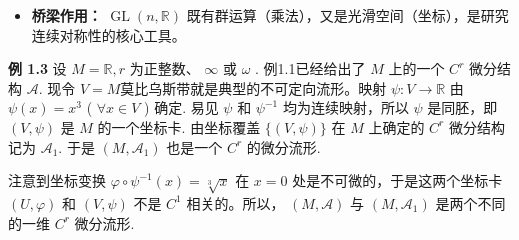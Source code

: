 \begin{myremark}
\begin{itemize}
\item \textbf{桥梁作用：}  $\operatorname{GL}(n, \mathbb{R}) $ 既有群运算（乘法），又是光滑空间（坐标），是研究连续对称性的核心工具。
\end{itemize}

%

\end{myremark}

{\bf 例 1.3} 设  $M = \mathbb{R}, r$  为正整数、 $\infty$  或  $\omega$ . 例1.1已经给出了  $M$  上的一个  $C^r$  微分结构  $\mathcal{A}$. 现令  $V = M$莫比乌斯带就是典型的不可定向流形。映射  $\psi : V \to \mathbb{R}$  由  $\psi(x) = x^3$  ( $\forall x \in V$ ) 确定. 易见  $\psi$  和  $\psi^{-1}$  均为连续映射，所以  $\psi$  是同胚，即  $(V, \psi)$  是  $M$  的一个坐标卡. 由坐标覆盖  $\{(V, \psi)\}$  在  $M$  上确定的  $C^r$  微分结构记为  $\mathcal{A}_1$. 于是  $(M, \mathcal{A}_1)$  也是一个  $C^r$  的微分流形.

注意到坐标变换  $\varphi \circ \psi^{-1}(x) = \sqrt[3]{x}$  在  $x = 0$  处是不可微的，于是这两个坐标卡  $(U, \varphi)$  和  $(V, \psi)$  不是  $C^1$  相关的。所以， $(M, \mathcal{A})$  与  $(M, \mathcal{A}_1)$  是两个不同的一维  $C^r$  微分流形.

